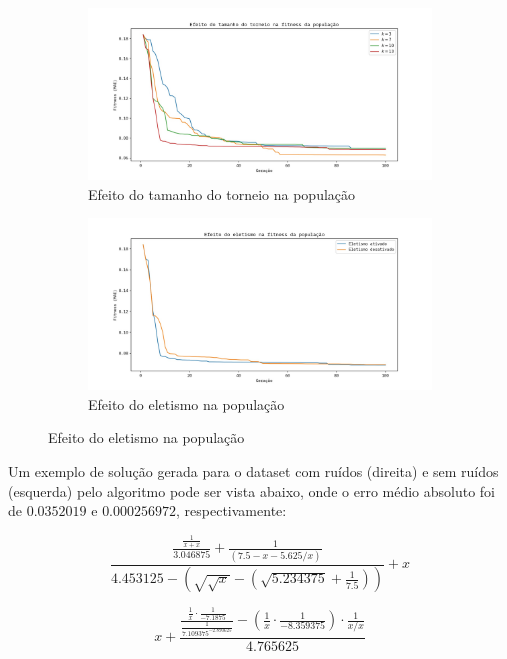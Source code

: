 \documentclass[a4paper]{article}
\begin{document}
\begin{figure}[h]
  \caption{Resultados para o dataset com ruídos}
  \label{fig:noise}
  \begin{subfigure}[t]{0.5\textwidth}
    \includegraphics[width=\textwidth]{sr_noise_k}
    \caption{Efeito do tamanho do torneio na população}
    \label{fig:noise_k}
  \end{subfigure}
  \begin{subfigure}[t]{0.5\textwidth}
    \includegraphics[width=\textwidth]{sr_noise_eletism}
    \caption{Efeito do eletismo na população}
    \label{fig:noise_eletism}
  \end{subfigure}
\end{figure}

Um exemplo de solução gerada para o dataset com ruídos (direita) e sem ruídos
(esquerda) pelo algoritmo pode ser vista abaixo, onde o erro médio absoluto foi
de $0.0352019$ e $0.000256972$, respectivamente:

\noindent\begin{minipage}[t]{0.5\textwidth}
\begin{equation*}
\frac{\frac{\frac{1}{x+x}}{3.046875}+\frac{1}{(7.5-x-5.625/x)}}{4.453125-(\sqrt{\sqrt{x}}-(\sqrt{5.234375}+\frac{1}{7.5}))}+x
\end{equation*}
\end{minipage}
\begin{minipage}[t]{0.5\textwidth}
  \begin{equation*}
    x+\frac{\frac{\frac{1}{x}\cdot\frac{1}{-7.1875}}{\frac{1}{7.109375^{-2.890625}}}-(\frac{1}{x}\cdot\frac{1}{-8.359375})\cdot\frac{1}{x/x}}{4.765625}
  \end{equation*}
\end{minipage}
\vspace{0.5cm}
\end{document}
